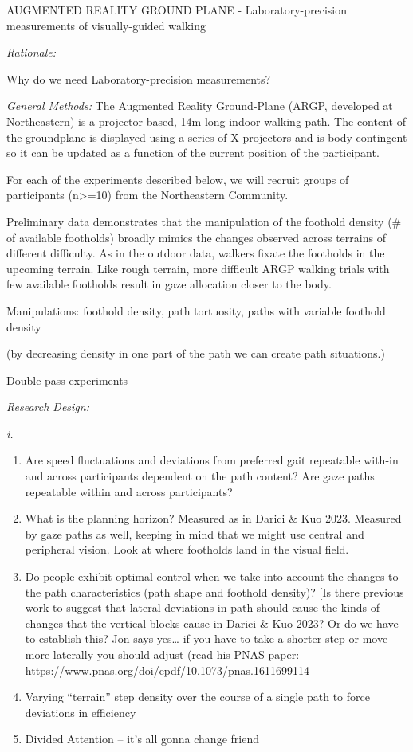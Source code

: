 AUGMENTED REALITY GROUND PLANE - Laboratory-precision measurements of
visually-guided walking

\emph{Rationale:}

Why do we need Laboratory-precision measurements?

\emph{General Methods:} The Augmented Reality Ground-Plane (ARGP,
developed at Northeastern) is a projector-based, 14m-long indoor walking
path. The content of the groundplane is displayed using a series of X
projectors and is body-contingent so it can be updated as a function of
the current position of the participant.

For each of the experiments described below, we will recruit groups of
participants (n\textgreater=10) from the Northeastern Community.

Preliminary data demonstrates that the manipulation of the foothold
density (\# of available footholds) broadly mimics the changes observed
across terrains of different difficulty. As in the outdoor data, walkers
fixate the footholds in the upcoming terrain. Like rough terrain, more
difficult ARGP walking trials with few available footholds result in
gaze allocation closer to the body.

Manipulations: foothold density, path tortuosity, paths with variable
foothold density

(by decreasing density in one part of the path we can create path
situations.)

Double-pass experiments

\emph{Research Design:}

\emph{i.}

\begin{enumerate}
\def\labelenumi{\Alph{enumi}.}
\item
  Are speed fluctuations and deviations from preferred gait repeatable
  with-in and across participants dependent on the path content? Are
  gaze paths repeatable within and across participants?
\item
  What is the planning horizon? Measured as in Darici \& Kuo 2023.
  Measured by gaze paths as well, keeping in mind that we might use
  central and peripheral vision. Look at where footholds land in the
  visual field.
\item
  Do people exhibit optimal control when we take into account the
  changes to the path characteristics (path shape and foothold density)?
  {[}Is there previous work to suggest that lateral deviations in path
  should cause the kinds of changes that the vertical blocks cause in
  Darici \& Kuo 2023? Or do we have to establish this? Jon says
  yes\ldots{} if you have to take a shorter step or move more laterally
  you should adjust (read his PNAS paper:
  \href{https://www.pnas.org/doi/epdf/10.1073/pnas.1611699114}{\ul{https://www.pnas.org/doi/epdf/10.1073/pnas.1611699114}}
\item
  Varying ``terrain'' step density over the course of a single path to
  force deviations in efficiency
\item
  Divided Attention -- it's all gonna change friend
\end{enumerate}

